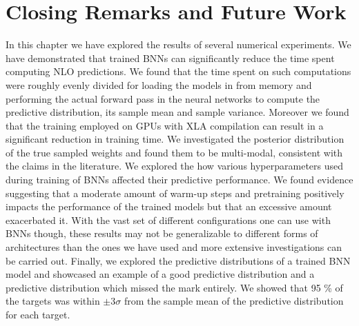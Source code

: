 
\section{Closing Remarks and Future Work}
In this chapter we have explored the results of several numerical experiments. We have demonstrated that trained BNNs can significantly reduce the time spent computing NLO predictions. We found that the time spent on such computations were roughly evenly divided for loading the models in from memory and performing the actual forward pass in the neural networks to compute the predictive distribution, its sample mean and sample variance. Moreover we found that the training employed on GPUs with XLA compilation can result in a significant reduction in training time.
We investigated the posterior distribution of the true sampled weights and found them to be multi-modal, consistent with the claims in the literature. We explored the how various hyperparameters used during training of BNNs affected their predictive performance. We found evidence suggesting that a moderate amount of warm-up steps and pretraining positively impacts the performance of the trained models but that an excessive amount exacerbated it. With the vast set of different configurations one can use with BNNs though, these results may not be generalizable to different forms of architectures than the ones we have used and more extensive investigations can be carried out. Finally, we explored the predictive distributions of a trained BNN model and showcased an example of a good predictive distribution and a predictive distribution which missed the mark entirely. We showed that 95 \% of the targets was within $\pm 3 \sigma$ from the sample mean of the predictive distribution for each target. 


